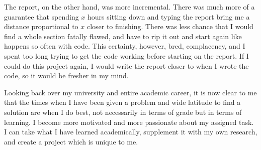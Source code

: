 \documentclass{article}
\begin{document}
The report, on the other hand, was more incremental. There was much more of a guarantee that spending \( x \) hours sitting down and typing the report bring me a distance proportional to \( x \) closer to finishing. There was less chance that I would find a whole section fatally flawed, and have to rip it out and start again like happens so often with code. This certainty, however, bred, complacency, and I spent too long trying to get the code working before starting on the report. If I could do this project again, I would write the report closer to when I wrote the code, so it would be fresher in my mind.

Looking back over my university and entire academic career, it is now clear to me that the times when I have been given a problem and wide latitude to find a solution are when I do best, not necessarily in terms of grade but in terms of learning. I become more motivated and more passionate about my assigned task. I can take what I have learned academically, supplement it with my own research, and create a project which is unique to me.
\end{document}
